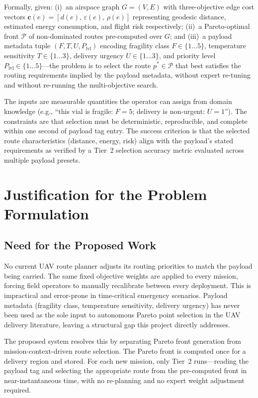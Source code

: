 \documentclass{ssnreview}
\begin{document}
Formally, given:
(i)~an airspace graph $G = (V, E)$ with three-objective edge cost vectors
$\mathbf{c}(e) = [d(e),\, \varepsilon(e),\, \rho(e)]$ representing geodesic distance,
estimated energy consumption, and flight risk respectively;
(ii)~a Pareto-optimal front $\mathcal{P}$ of non-dominated routes pre-computed over $G$;
and (iii)~a payload metadata tuple $(F, T, U, P_\mathrm{lvl})$ encoding fragility class
$F \in \{1\ldots5\}$, temperature sensitivity $T \in \{1\ldots3\}$, delivery urgency
$U \in \{1\ldots3\}$, and priority level $P_\mathrm{lvl} \in \{1\ldots5\}$---the
problem is to select the route $p^* \in \mathcal{P}$ that best satisfies the routing
requirements implied by the payload metadata, without expert re-tuning and without
re-running the multi-objective search.

The inputs are measurable quantities the operator can assign from domain knowledge (e.g.,
``this vial is fragile: $F = 5$; delivery is non-urgent: $U = 1$''). The constraints are
that selection must be deterministic, reproducible, and complete within one second of
payload tag entry. The success criterion is that the selected route characteristics
(distance, energy, risk) align with the payload's stated requirements as verified by a
Tier~2 selection accuracy metric evaluated across multiple payload presets.

\chapter{Justification for the Problem Formulation}

\section{Need for the Proposed Work}

No current UAV route planner adjusts its routing priorities to match the payload being
carried. The same fixed objective weights are applied to every mission, forcing field
operators to manually recalibrate between every deployment. This is impractical and
error-prone in time-critical emergency scenarios. Payload metadata (fragility class,
temperature sensitivity, delivery urgency) has never been used as the sole input to
autonomous Pareto point selection in the UAV delivery literature, leaving a structural
gap this project directly addresses.

The proposed system resolves this by separating Pareto front generation from
mission-context-driven route selection. The Pareto front is computed once for a delivery
region and stored. For each new mission, only Tier~2 runs---reading the payload tag and
selecting the appropriate route from the pre-computed front in near-instantaneous time,
with no re-planning and no expert weight adjustment required.
\end{document}
